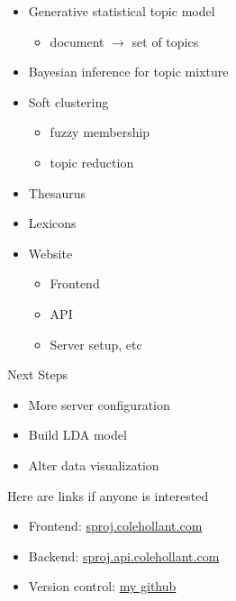 \documentclass[12pt, oneside, reqno]{article}
\begin{document}

\begin{itemize}
  \item Generative statistical topic model
  \begin{itemize}
    \item document $\rightarrow$ set of topics
  \end{itemize}
  \item Bayesian inference for topic mixture
  \item Soft clustering
  \begin{itemize}
    \item fuzzy membership
    \item topic reduction
  \end{itemize}
\end{itemize}




\begin{itemize}
  \item Thesaurus
  \item Lexicons
  \item Website
  \begin{itemize}
    \item Frontend
    \item API
    \item Server setup, etc
  \end{itemize}
\end{itemize}

Next Steps
\begin{itemize}
  \item More server configuration
  \item Build LDA model
  \item Alter data visualization
\end{itemize}


Here are links if anyone is interested
\begin{itemize}
  \item Frontend: \href{https://sproj.colehollant.com}{sproj.colehollant.com}
  \item Backend: \href{https://sproj.api.colehollant.com/thesaurus/api/v1/words/cool}{sproj.api.colehollant.com}
  \item Version control: \href{https://github.com/colehollant/sproj}{my github}
\end{itemize}
\end{document}
